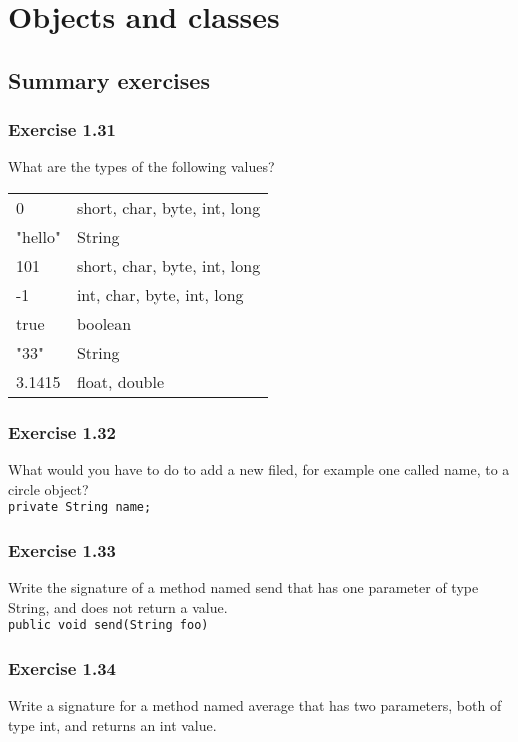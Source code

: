 \section{Objects and classes}

\subsection{Summary exercises}

\subsubsection*{Exercise 1.31}
What are the types of the following values? \\

\begin{tabular}{ l l }
	0	& short, char, byte, int, long 	\\
	"hello"	& String			\\
	101	& short, char, byte, int, long	\\
	-1	& int, char, byte, int, long	\\
	true	& boolean			\\
	"33"	& String			\\
	3.1415	& float, double			\\
\end{tabular}

\subsubsection*{Exercise 1.32}
What would you have to do to add a new filed, for example one called name, to 
a circle object?\\

\lstinline{private String name;}

\subsubsection*{Exercise 1.33}
Write the signature of a method named send that has one parameter of type 
String, and does not return a value.\\

\lstinline{public void send(String foo)}

\subsubsection*{Exercise 1.34}
Write a signature for a method named average that has two parameters, both of 
type int, and returns an int value.\\

